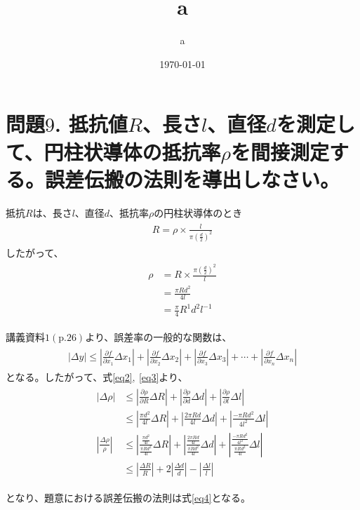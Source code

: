 \documentclass[a4paper,11pt]{jsarticle}
\begin{document}
\title{a}
\author{a}
\date{\today}

\section*{問題$9$. 抵抗値$R$、長さ$l$、直径$d$を測定して、円柱状導体の抵抗率$\rho $を間接測定する。誤差伝搬の法則を導出しなさい。}

抵抗$R$は、長さ$l$、直径$d$、抵抗率$\rho $の円柱状導体のとき
\begin{align}
  \begin{split}
    R=\rho \times \frac{l}{\pi {\left(\frac{d}{2}\right)}^{2}}
    \label{eq1}
  \end{split}
\end{align}
したがって、
\begin{align}
  \begin{split}
    \rho
    &=R \times \frac{{\pi \left(\frac{d}{2}\right)}^{2}}{l}\\
    &=\frac{\pi R d^{2}}{4l}\\
    &=\frac{\pi }{4}R^{1} d^{2} l^{-1}
    \label{eq2}
  \end{split}
\end{align}

講義資料$1(\mathrm{p}. 26)$より、誤差率の一般的な関数は、
\begin{align}
  \begin{split}
    \left|\Delta y\right|\leq \left|\frac{\partial f}{\partial x_{1}}\Delta x_{1}\right|+\left|\frac{\partial f}{\partial x_{2}}\Delta x_{2}\right|+\left|\frac{\partial f}{\partial x_{3}}\Delta x_{3}\right|+\cdots +\left|\frac{\partial f}{\partial x_{n}}\Delta x_{n}\right|
    \label{eq3}
  \end{split}
\end{align}
となる。したがって、式\eqref{eq2}$,\ $\eqref{eq3}より、
\begin{align}
  \begin{split}
    \left|\Delta \rho\right|
    &\leq \left|\frac{\partial \rho }{\partial R}\Delta R\right|+\left|\frac{\partial \rho }{\partial d}\Delta d\right|+\left|\frac{\partial \rho }{\partial l}\Delta l\right|\\
    &\leq \left|\frac{\pi d^{2}}{4l}\Delta R\right|+\left|\frac{2\pi R d}{4l}\Delta d\right|+\left|\frac{-\pi R d^{2}}{4l^{2}}\Delta l\right|\\
    \left|\frac{\Delta \rho}{\rho}\right|
    &\leq \left|\frac{\frac{\pi d^{2}}{4l}}{\frac{\pi R d^{2}}{4l}}\Delta R\right|+\left|\frac{\frac{2\pi R d}{4l}}{\frac{\pi R d^{2}}{4l}}\Delta d\right|+\left|\frac{\frac{-\pi R d^{2}}{4l^{2}}}{\frac{\pi R d^{2}}{4l}}\Delta l\right|\\
    &\leq \left|\frac{\Delta R}{R}\right|+2\left|\frac{\Delta d}{d}\right|-\left|\frac{\Delta l}{l}\right|
    \label{eq4}
  \end{split}
\end{align}

となり、題意における誤差伝搬の法則は式\eqref{eq4}となる。
\end{document}
